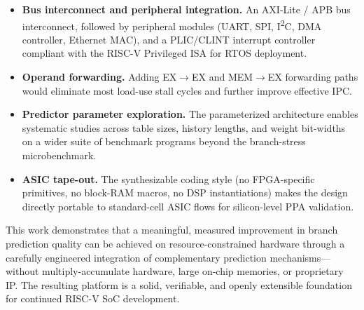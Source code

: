 \documentclass[12pt,a4paper]{article}
\begin{document}
\begin{itemize}
  \item \textbf{Bus interconnect and peripheral integration.}
    An AXI-Lite / APB bus interconnect, followed by peripheral modules (UART, SPI,
    I\textsuperscript{2}C, DMA controller, Ethernet MAC), and a PLIC/CLINT interrupt
    controller compliant with the RISC-V Privileged ISA for RTOS deployment.

  \item \textbf{Operand forwarding.}
    Adding EX$\rightarrow$EX and MEM$\rightarrow$EX forwarding paths would
    eliminate most load-use stall cycles and further improve effective IPC.

  \item \textbf{Predictor parameter exploration.}
    The parameterized architecture enables systematic studies across table sizes,
    history lengths, and weight bit-widths on a wider suite of benchmark programs
    beyond the branch-stress microbenchmark.

  \item \textbf{ASIC tape-out.}
    The synthesizable coding style (no FPGA-specific primitives, no block-RAM
    macros, no DSP instantiations) makes the design directly portable to
    standard-cell ASIC flows for silicon-level PPA validation.
\end{itemize}

This work demonstrates that a meaningful, measured improvement in branch prediction
quality can be achieved on resource-constrained hardware through a carefully
engineered integration of complementary prediction mechanisms---without
multiply-accumulate hardware, large on-chip memories, or proprietary IP. The
resulting platform is a solid, verifiable, and openly extensible foundation for
continued RISC-V SoC development.

\newpage

\end{document}
